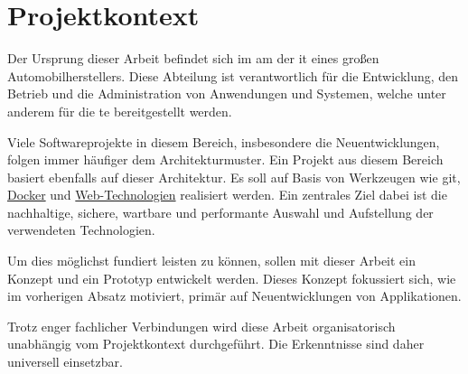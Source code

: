 \section{Projektkontext}
\label{sec:01-02_project-context}

Der Ursprung dieser Arbeit befindet sich im \Gls{am} der \acrshort{it} eines großen Automobilherstellers. Diese Abteilung ist verantwortlich für die Entwicklung, den Betrieb und die Administration von Anwendungen und Systemen, welche unter anderem für die \acrshort{te} bereitgestellt werden.

Viele Softwareprojekte in diesem Bereich, insbesondere die Neuentwicklungen, folgen immer häufiger dem  Architekturmuster. Ein Projekt aus diesem Bereich basiert ebenfalls auf dieser Architektur. Es soll auf Basis von Werkzeugen wie \Gls{git}, \hyperref[sec:02-03_containerization]{Docker} und \hyperref[sec:02-01_web-development]{Web-Technologien} realisiert werden. Ein zentrales Ziel dabei ist die nachhaltige, sichere, wartbare und performante Auswahl und Aufstellung der verwendeten Technologien.

Um dies möglichst fundiert leisten zu können, sollen mit dieser Arbeit ein Konzept und ein Prototyp entwickelt werden. Dieses Konzept fokussiert sich, wie im vorherigen Absatz motiviert, primär auf Neuentwicklungen von Applikationen.

Trotz enger fachlicher Verbindungen wird diese Arbeit organisatorisch unabhängig vom Projektkontext durchgeführt. Die Erkenntnisse sind daher universell einsetzbar.
